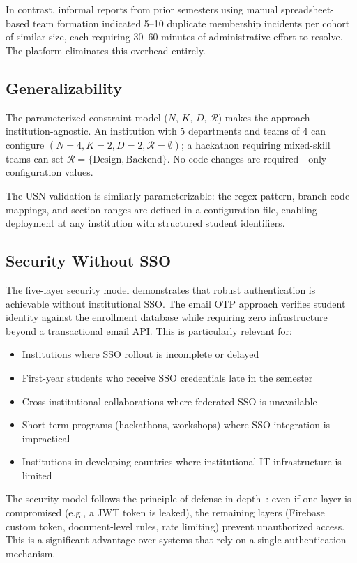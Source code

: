 \documentclass[conference]{IEEEtran}
\begin{document}
In contrast, informal reports from prior semesters using manual spreadsheet-based team formation indicated 5--10 duplicate membership incidents per cohort of similar size, each requiring 30--60 minutes of administrative effort to resolve. The platform eliminates this overhead entirely.

\subsection{Generalizability}

The parameterized constraint model ($N$, $K$, $D$, $\mathcal{R}$) makes the approach institution-agnostic. An institution with 5 departments and teams of 4 can configure $(N=4, K=2, D=2, \mathcal{R}=\emptyset)$; a hackathon requiring mixed-skill teams can set $\mathcal{R} = \{\text{Design}, \text{Backend}\}$. No code changes are required---only configuration values.

The USN validation is similarly parameterizable: the regex pattern, branch code mappings, and section ranges are defined in a configuration file, enabling deployment at any institution with structured student identifiers.

\subsection{Security Without SSO}

The five-layer security model demonstrates that robust authentication is achievable without institutional SSO. The email OTP approach verifies student identity against the enrollment database while requiring zero infrastructure beyond a transactional email API. This is particularly relevant for:

\begin{itemize}[noitemsep,topsep=3pt]
    \item Institutions where SSO rollout is incomplete or delayed
    \item First-year students who receive SSO credentials late in the semester
    \item Cross-institutional collaborations where federated SSO is unavailable
    \item Short-term programs (hackathons, workshops) where SSO integration is impractical
    \item Institutions in developing countries where institutional IT infrastructure is limited
\end{itemize}

The security model follows the principle of defense in depth~\cite{owasp2021}: even if one layer is compromised (e.g., a JWT token is leaked), the remaining layers (Firebase custom token, document-level rules, rate limiting) prevent unauthorized access. This is a significant advantage over systems that rely on a single authentication mechanism.
\end{document}
